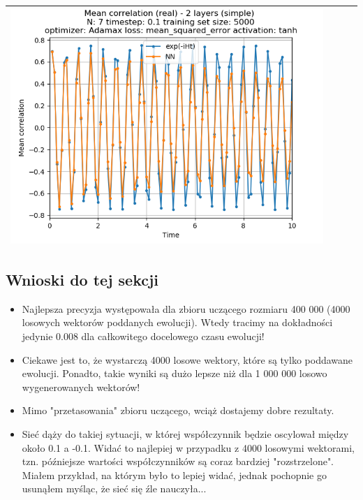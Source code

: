 \documentclass{article}
\begin{document}
\begin{tabular}{|c|c|c|c|}
     \includegraphics[scale=0.37]{./Searching_for_good_train_set_size/2_layers_simple_train_samples=5000_timestep=0.1_t_total=10.0_optimizer=Adamax_loss=mean_squared_error_activation=tanh/Corr_N=7_(real).png} \\ \hline

\end{tabular}

\subsection{Wnioski do tej sekcji}

\begin{itemize}
	\item Najlepsza precyzja występowała dla zbioru uczącego rozmiaru 400 000 (4000 losowych wektorów poddanych ewolucji). Wtedy tracimy na dokładności jedynie 0.008 dla całkowitego docelowego czasu ewolucji!
	\item Ciekawe jest to, że wystarczą 4000 losowe wektory, które są tylko poddawane ewolucji. Ponadto, takie wyniki są dużo lepsze niż dla 1 000 000 losowo wygenerowanych wektorów!
	\item Mimo "przetasowania" zbioru uczącego, wciąż dostajemy dobre rezultaty.
	\item Sieć dąży do takiej sytuacji, w której współczynnik będzie oscylował między około 0.1 a -0.1. Widać to najlepiej w przypadku z 4000 losowymi wektorami, tzn. późniejsze wartości współczynników są coraz bardziej "rozstrzelone". Miałem przykład, na którym było to lepiej widać, jednak pochopnie go usunąłem myśląc, że sieć się źle nauczyła...
\end{itemize}
\end{document}
